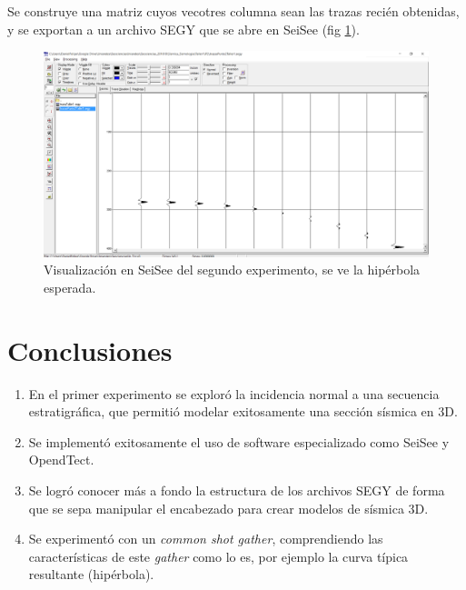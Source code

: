\documentclass[%
 aip,
 jmp,%
 amsmath,amssymb,
 reprint,%
]{revtex4-1}
\begin{document}
Se construye una matriz cuyos vecotres columna sean las trazas recién obtenidas, y se exportan a un archivo SEGY que se abre en SeiSee (fig \ref{fig:exp2}).

\begin{figure}[h]
\centering
\includegraphics[width=1\linewidth]{exp2}
\caption{Visualización en SeiSee del segundo experimento, se ve la hipérbola esperada.}
\label{fig:exp2}
\end{figure}

\section{Conclusiones}
\begin{enumerate}
	\item En el primer experimento se exploró la incidencia normal a una secuencia estratigráfica, que permitió modelar exitosamente una sección sísmica en 3D.
	\item Se implementó exitosamente el uso de software especializado como SeiSee y OpendTect.
	\item Se logró conocer más a fondo la estructura de los archivos SEGY de forma que se sepa manipular el encabezado para crear modelos de sísmica 3D.
	\item Se experimentó con un \textit{common shot gather}, comprendiendo las características de este \textit{gather} como lo es, por ejemplo la curva típica resultante (hipérbola).
\end{enumerate}


\end{document}
